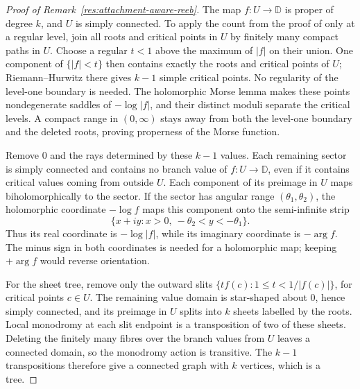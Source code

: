 \begin{proof}[Proof of Remark~\ref{res:attachment-aware-reeb}]
The map $f:U\to\mathbb D$ is proper of degree $k$, and $U$ is simply
connected. To apply the count from the proof of
\cite[Proposition~2.1]{eks2010} only at a regular level, join all roots and
critical points in $U$ by finitely many compact paths in $U$. Choose a
regular $t<1$ above the maximum of $|f|$ on their union. One component of
$\{|f|<t\}$ then contains exactly the roots and critical points of $U$;
Riemann--Hurwitz there gives $k-1$ simple critical points. No regularity
of the level-one boundary is needed. The holomorphic Morse lemma makes
these points nondegenerate saddles of $-\log|f|$, and their distinct
moduli separate the critical levels. A compact range in $(0,\infty)$
stays away from both the level-one boundary and the deleted roots, proving
properness of the Morse function.

Remove $0$ and the rays determined by these $k-1$ values. Each remaining
sector is simply connected and contains no branch value of
$f:U\to\mathbb D$, even if it contains critical values coming from outside
$U$. Each component of its preimage in $U$ maps biholomorphically to the
sector. If the sector has angular range $(\theta_1,\theta_2)$, the
holomorphic coordinate $-\log f$ maps this component onto the
semi-infinite strip
\[
 \{x+iy:x>0,\ -\theta_2<y<-\theta_1\}.
\]
Thus its real coordinate is $-\log|f|$, while its imaginary coordinate
is $-\arg f$. The minus sign in both coordinates is needed for a
holomorphic map; keeping $+\arg f$ would reverse orientation.

For the sheet tree, remove only the outward slits
$\{tf(c):1\le t<1/|f(c)|\}$, for critical points $c\in U$.
The remaining value domain is star-shaped about $0$, hence simply
connected, and its preimage in $U$ splits into $k$ sheets labelled by the
roots. Local monodromy at each slit endpoint is a transposition of two
of these sheets. Deleting the finitely many fibres over the branch values
from $U$ leaves a connected domain, so the monodromy action is transitive.
The $k-1$ transpositions therefore give a connected graph with $k$ vertices,
which is a tree.


\end{proof}
